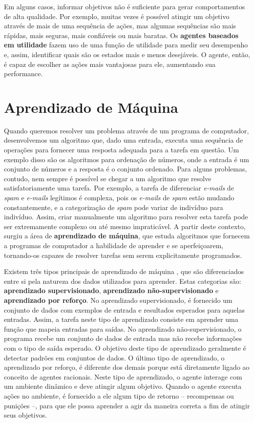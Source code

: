Em alguns casos, informar objetivos não é suficiente para gerar comportamentos
de alta qualidade. Por exemplo, muitas vezes é possível atingir um objetivo
através de mais de uma sequência de ações, mas algumas sequências são mais
rápidas, mais seguras, mais confiáveis ou mais baratas. Os \textbf{agentes
baseados em utilidade} fazem uso de uma função de utilidade para medir seu
desempenho e, assim, identificar quais são os estados mais e menos desejáveis. O
agente, então, é capaz de escolher as ações mais vantajosas para ele, aumentando
sua performance.


\section{\label{section:machine-learning}Aprendizado de Máquina}
Quando queremos resolver um problema através de um programa de computador,
desenvolvemos um algoritmo que, dado uma entrada, executa uma sequência de
operações para fornecer uma resposta adequada para a tarefa em questão. Um
exemplo disso são os algoritmos para ordenação de números, onde a entrada é
um conjunto de números e a resposta é o conjunto ordenado. Para alguns
problemas, contudo, nem sempre é possível se chegar a um algoritmo que resolve
satisfatoriamente uma tarefa. Por exemplo, a tarefa de diferenciar
\textit{e-mails} de \textit{spam} e \textit{e-mails} legítimos é complexa, pois
os \textit{e-mails} de \textit{spam} estão mudando constantemente, e a
categorização de \textit{spam} pode variar de indivíduo para indivíduo. Assim,
criar manualmente um algoritmo para resolver esta tarefa pode ser extremamente
complexo ou até mesmo impraticável. A partir deste contexto, surgiu a área de
\textbf{aprendizado de máquina}, que estuda algoritmos que fornecem a programas
de computador a habilidade de aprender e se aperfeiçoarem, tornando-os capazes
de resolver tarefas sem serem explicitamente programados.

Existem três tipos principais de aprendizado de máquina \cite[cap.
18]{RussellNorvig200912}, que são diferenciados entre si pela natureza dos dados
utilizados para aprender. Estas categorias são: \textbf{aprendizado
supervisionado}, \textbf{aprendizado não-supervisionado} e \textbf{aprendizado
por reforço}. No aprendizado supervisionado, é fornecido um conjunto de dados
com exemplos de entrada e resultados esperados para aquelas entradas. Assim, a
tarefa neste tipo de aprendizado consiste em aprender uma função que mapeia
entradas para saídas. No aprendizado não-supervisionado, o programa recebe um
conjunto de dados de entrada mas não recebe informações com o tipo de saída
esperado. O objetivo deste tipo de aprendizado geralmente é detectar padrões em
conjuntos de dados.  O último tipo de aprendizado, o aprendizado por reforço, é
diferente dos demais porque está diretamente ligado ao conceito de agentes
racionais.  Neste tipo de aprendizado, o agente interage com um ambiente
dinâmico e deve atingir algum objetivo. Quando o agente executa ações no
ambiente, é fornecido a ele algum tipo de retorno -- recompensas ou punições --,
para que ele possa aprender a agir da maneira correta a fim de atingir seus
objetivos.

